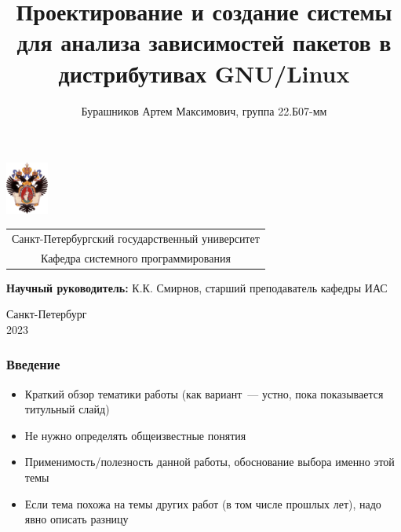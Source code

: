 \documentclass{beamer}
\title[Метаданные пакетов в Linux]{Проектирование и создание системы для анализа зависимостей пакетов в дистрибутивах GNU/Linux}
\institute[СПбГУ]{}
\author[Бурашников Артем]{Бурашников Артем Максимович, группа 22.Б07-мм}
\begin{document}
{
\begin{frame}
	\includegraphics[width=1.4cm]{pictures/SPbGU_Logo.png}
	\vspace{-35pt}
	\hspace{-10pt}
	\begin{center}
		\begin{tabular}{c}
			\scriptsize{Санкт-Петербургский государственный университет} \\
			\scriptsize{Кафедра системного программирования}
		\end{tabular}
		\titlepage
	\end{center}

	\btVFill

	{\scriptsize
		\textbf{Научный руководитель:} К.К. Смирнов, старший преподаватель кафедры ИАС \\
	}
	\begin{center}
		\vspace{5pt}
		\scriptsize{Санкт-Петербург\\
			2023}
	\end{center}

\end{frame}
}

\begin{frame}[fragile]
	\frametitle{Введение}
	\begin{itemize}
		\item Краткий обзор тематики работы (как вариант~--- устно, пока показывается титульный слайд)
		\item Не нужно определять общеизвестные понятия
		\item Применимость/полезность данной работы, обоснование выбора именно этой темы
		\item Если тема похожа на темы других работ (в том числе прошлых лет), надо явно описать разницу
	\end{itemize}
\end{frame}
\end{document}
